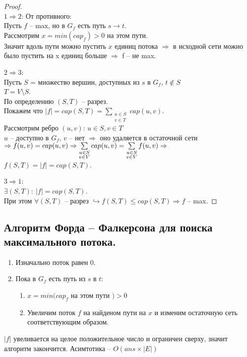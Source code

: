 \begin{proof} \ \\
	\underline{$1 \Rightarrow 2$}: От противного: \\
		Пусть  $f$ -- max, но в  $G_f$ есть путь  $s \rightarrow t$. \\
		Рассмотрим  $x = min(cap_f) > 0$ на этом пути. \\
		Значит вдоль пути можно пустить  $x$ единиц потока  $\Rightarrow$ в исходной сети можно было пустить на x единиц больше $\Rightarrow$ f -- не  max. 

		\underline{$2 \Rightarrow 3$}: \\
		Пусть $S$ = множество вершин, доступных из  $s$ в  $G_f$,  $t \notin S$ \\
		$T = V \setminus S$. \\
		По определению $(S, T)$ -- разрез. \\
		Покажем что $\lvert f \rvert = cap(S, T) = \sum\limits_{\substack{u \in S \\ v \in T}} cap(u, v)$. \\
		Рассмотрим ребро $(u, v)$: $u \in S, v \in T$ \\
		$u$ -- доступно в  $G_f$,  $v$ -- нет  $\Rightarrow$ оно удаляется в остаточной сети $\Rightarrow \\
		f(u, v) = cap(u, v) \Rightarrow \sum\limits_{\substack{u \in S \\ v \in V}} cap(u, v) = \sum\limits_{\substack{u \in S \\ v \in V}} f(u, v) \Rightarrow$ \\
		$f(S, T) = \lvert f \rvert = cap(S, T)$. 

		\underline{$3 \Rightarrow 1$}: \\
	$\exists (S, T):\ \lvert f \rvert = cap(S, T)$. \\
	При этом $\forall (S, T)$ -- разрез $\hookrightarrow f(S, T) \leq cap(S, T) \Rightarrow f$  -- max. 
\end{proof}

\subsection{Алгоритм Форда -- Фалкерсона для поиска максимального потока.}
\begin{enumerate}
	\item Изначально поток равен 0.
	\item Пока в $G_f$ есть путь из  $s$ в  $t$:
		\begin{enumerate}
			\item $x = min(cap_f$ на этом пути  $) > 0$ 
			\item Увеличим поток $f$ на найденом пути на $x$ и изменим остаточную сеть соответствующим образом.
		\end{enumerate}
\end{enumerate}
$\lvert f \rvert$ увеливается на целое положительное число и ограничен сверху, значит алгоритм закончится.
Асимтотика -- $O(ans \times \lvert E  \rvert)$  \\


